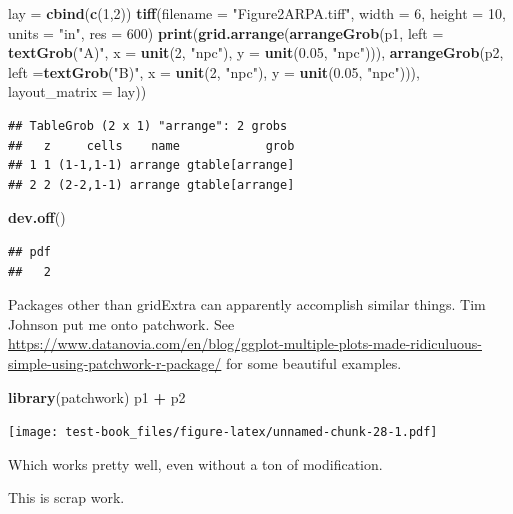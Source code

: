 \documentclass[]{book}
\newenvironment{Shaded}{\begin{snugshade}}{\end{snugshade}}
\newcommand{\DataTypeTok}[1]{\textcolor[rgb]{0.13,0.29,0.53}{#1}}
\newcommand{\DecValTok}[1]{\textcolor[rgb]{0.00,0.00,0.81}{#1}}
\newcommand{\FloatTok}[1]{\textcolor[rgb]{0.00,0.00,0.81}{#1}}
\newcommand{\KeywordTok}[1]{\textcolor[rgb]{0.13,0.29,0.53}{\textbf{#1}}}
\newcommand{\NormalTok}[1]{#1}
\newcommand{\OperatorTok}[1]{\textcolor[rgb]{0.81,0.36,0.00}{\textbf{#1}}}
\newcommand{\StringTok}[1]{\textcolor[rgb]{0.31,0.60,0.02}{#1}}
\begin{document}
\begin{Shaded}
\begin{Highlighting}[]
\NormalTok{lay =}\StringTok{ }\KeywordTok{cbind}\NormalTok{(}\KeywordTok{c}\NormalTok{(}\DecValTok{1}\NormalTok{,}\DecValTok{2}\NormalTok{))}
\KeywordTok{tiff}\NormalTok{(}\DataTypeTok{filename =} \StringTok{"Figure2ARPA.tiff"}\NormalTok{, }\DataTypeTok{width =} \DecValTok{6}\NormalTok{, }\DataTypeTok{height =} \DecValTok{10}\NormalTok{, }\DataTypeTok{units =} \StringTok{"in"}\NormalTok{, }\DataTypeTok{res =} \DecValTok{600}\NormalTok{)}
\KeywordTok{print}\NormalTok{(}\KeywordTok{grid.arrange}\NormalTok{(}\KeywordTok{arrangeGrob}\NormalTok{(p1, }\DataTypeTok{left =} \KeywordTok{textGrob}\NormalTok{(}\StringTok{"A)"}\NormalTok{, }\DataTypeTok{x =} \KeywordTok{unit}\NormalTok{(}\DecValTok{2}\NormalTok{, }\StringTok{"npc"}\NormalTok{), }
                               \DataTypeTok{y =} \KeywordTok{unit}\NormalTok{(}\FloatTok{0.05}\NormalTok{, }\StringTok{"npc"}\NormalTok{))), }
                   \KeywordTok{arrangeGrob}\NormalTok{(p2, }\DataTypeTok{left =}\KeywordTok{textGrob}\NormalTok{(}\StringTok{"B)"}\NormalTok{, }\DataTypeTok{x =} \KeywordTok{unit}\NormalTok{(}\DecValTok{2}\NormalTok{, }\StringTok{"npc"}\NormalTok{), }
                               \DataTypeTok{y =} \KeywordTok{unit}\NormalTok{(}\FloatTok{0.05}\NormalTok{, }\StringTok{"npc"}\NormalTok{))),}
                   \DataTypeTok{layout_matrix =}\NormalTok{ lay))}
\end{Highlighting}
\end{Shaded}

\begin{verbatim}
## TableGrob (2 x 1) "arrange": 2 grobs
##   z     cells    name            grob
## 1 1 (1-1,1-1) arrange gtable[arrange]
## 2 2 (2-2,1-1) arrange gtable[arrange]
\end{verbatim}

\begin{Shaded}
\begin{Highlighting}[]
\KeywordTok{dev.off}\NormalTok{()}
\end{Highlighting}
\end{Shaded}

\begin{verbatim}
## pdf 
##   2
\end{verbatim}

Packages other than gridExtra can apparently accomplish similar things. Tim Johnson put me onto patchwork. See \url{https://www.datanovia.com/en/blog/ggplot-multiple-plots-made-ridiculuous-simple-using-patchwork-r-package/} for some beautiful examples.

\begin{Shaded}
\begin{Highlighting}[]
\KeywordTok{library}\NormalTok{(patchwork)}
\NormalTok{p1 }\OperatorTok{+}\StringTok{ }\NormalTok{p2}
\end{Highlighting}
\end{Shaded}

\texttt{[image: test-book\_files/figure-latex/unnamed-chunk-28-1.pdf]}

Which works pretty well, even without a ton of modification.

This is scrap work.


\end{document}
